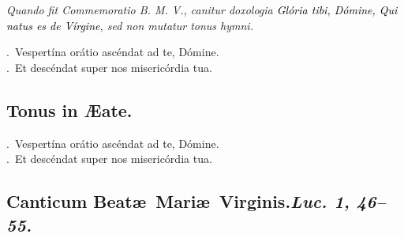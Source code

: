 \documentclass[12pt]{article} %
\newenvironment{rubric}{\vspace{1 mm}\color{benred8} \itshape \leftskip 0in \setlength{\parindent}{0.25in}}{\vspace{1 mm}}
\newenvironment{response}{\leftskip 0in \setlength{\parindent}{0in}}{\vspace{1 mm}}
\let\oldVbar\Vbar
\renewcommand{\Vbar}{\textcolor{benred8}{\oldVbar .}}
\let\oldRbar\Rbar
\renewcommand{\Rbar}{\textcolor{benred8}{\oldRbar .}}
\def\capitulumSpace{\hspace{20 mm}}
\begin{document}
\begin{rubric}
Quando fit Commemoratio B. M. V., canitur doxologia \emph{\textcolor{black}{Gl\'{o}ria tibi, D\'{o}mine, Qui natus es de V\'{i}rgine}}, sed non mutatur tonus hymni.

\end{rubric}

\begin{response}
\Vbar\ Vespert\'{i}na or\'{a}tio asc\'{e}ndat ad te, D\'{o}mine.\\
\Rbar\ Et desc\'{e}ndat super nos miseric\'{o}rdia tua.

\end{response}


\subsection*{}

\subsection*{Tonus in \AE {}ate.}


\gresetfirstlineaboveinitial{\small \textsc{ \textbf{\textcolor{benred8}{VIII}}}}{\small \textsc{ \textbf{\textcolor{benred8}{VIII}}}}

\begin{response}
\Vbar\ Vespert\'{i}na or\'{a}tio asc\'{e}ndat ad te, D\'{o}mine.\\
\Rbar\ Et desc\'{e}ndat super nos miseric\'{o}rdia tua.

\end{response}


\subsection*{}

\subsection*{Canticum Beat\ae\ Mari\ae\ Virginis.\capitulumSpace \emph{Luc. 1, 46--55.}}

\end{document}

